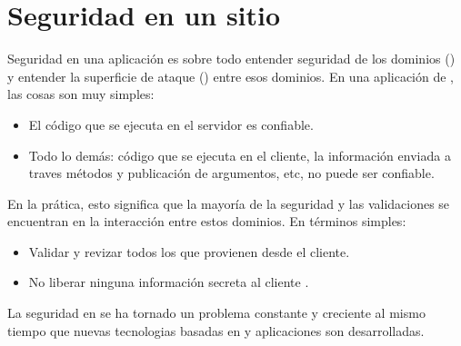 
\section{Seguridad en un sitio \ecommerceCOM}\label{cap:seguridad}


	Seguridad en una aplicación \webINT es sobre todo entender seguridad de los dominios (\securityDomainCPT) y entender la superficie de ataque (\attackSurfaceCPT) entre esos dominios. En una aplicación de \meteorNAME, las cosas son muy simples:

	\begin{itemize}
			\item
				El código que se ejecuta en el servidor es confiable.
			\item
				Todo lo demás: código que se ejecuta en el cliente, la información enviada a traves métodos y publicación de argumentos, etc, no puede ser confiable.
	\end{itemize}
	En la prática, esto significa que la mayoría de la seguridad y las validaciones se encuentran en la interacción entre estos dominios. En términos simples:
	\begin{itemize}
			\item
				Validar y revizar todos los  que provienen desde el cliente.
			\item
				No liberar ninguna información secreta al cliente \cite{online_meteor_security}.
	\end{itemize}



	La seguridad en \internetINT se ha tornado un problema constante y creciente al mismo tiempo que nuevas tecnologias basadas en \internetINT y aplicaciones son desarrolladas. 







